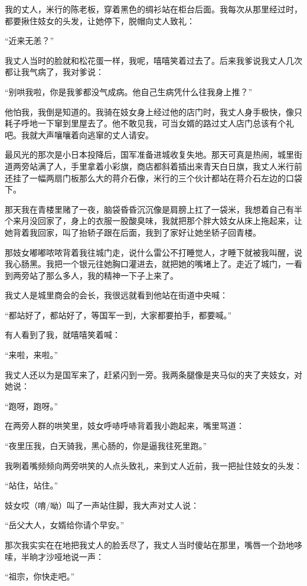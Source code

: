 \documentclass[12pt,UTF8]{ctexbook}
\begin{document}
我的丈人，米行的陈老板，穿着黑色的绸衫站在柜台后面。我每次从那里经过时，都要揪住妓女的头发，让她停下，脱帽向丈人致礼：

“近来无恙？”

我丈人当时的脸就和松花蛋一样，我呢，嘻嘻笑着过去了。后来我爹说我丈人几次都让我气病了，我对爹说：

“别哄我啦，你是我爹都没气成病。他自己生病凭什么往我身上推？”

他怕我，我倒是知道的。我骑在妓女身上经过他的店门时，我丈人身手极快，像只耗子呼地一下窜到里屋去了。他不敢见我，可当女婿的路过丈人店门总该有个礼吧。我就大声嚷嚷着向逃窜的丈人请安。

最风光的那次是小日本投降后，国军准备进城收复失地。那天可真是热闹，城里街道两旁站满了人，手里拿着小彩旗，商店都斜着插出来青天白日旗，我丈人米行前还挂了一幅两扇门板那么大的蒋介石像，米行的三个伙计都站在蒋介石左边的口袋下。

那天我在青楼里赌了一夜，脑袋昏昏沉沉像是肩膀上扛了一袋米，我想着自己有半个来月没回家了，身上的衣服一股酸臭味，我就把那个胖大妓女从床上拖起来，让她背着我回家，叫了抬轿子跟在后面，我到了家好让她坐轿子回青楼。

那妓女嘟嘟哝哝背着我往城门走，说什么雷公不打睡觉人，才睡下就被我叫醒，说我心肠黑。我把一个银元往她胸口灌进去，就把她的嘴堵上了。走近了城门，一看到两旁站了那么多人，我的精神一下子上来了。

我丈人是城里商会的会长，我很远就看到他站在街道中央喊：

“都站好了，都站好了，等国军一到，大家都要拍手，都要喊。”

有人看到了我，就嘻嘻笑着喊：

“来啦，来啦。”

我丈人还以为是国军来了，赶紧闪到一旁。我两条腿像是夹马似的夹了夹妓女，对她说：

“跑呀，跑呀。”

在两旁人群的哄笑里，妓女呼哧呼哧背着我小跑起来，嘴里骂道：

“夜里压我，白天骑我，黑心肠的，你是逼我往死里跑。”

我咧着嘴频频向两旁哄笑的人点头致礼，来到丈人近前，我一把扯住妓女的头发：

“站住，站住。”

妓女哎（唷/呦）叫了一声站住脚，我大声对丈人说：

“岳父大人，女婿给你请个早安。”

那次我实实在在地把我丈人的脸丢尽了，我丈人当时傻站在那里，嘴唇一个劲地哆嗦，半晌才沙哑地说一声：

“祖宗，你快走吧。”
\end{document}

